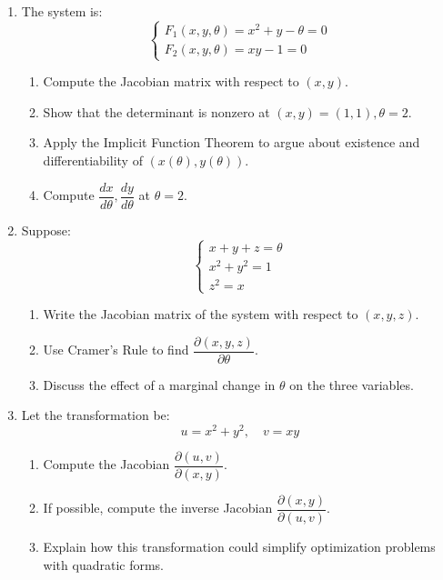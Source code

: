 \documentclass[12pt]{article}
\begin{document}
\begin{enumerate}
\item The system is:
\[
\begin{cases}
F_1(x,y,\theta) = x^2 + y - \theta = 0 \\
F_2(x,y,\theta) = xy - 1 = 0
\end{cases}
\]
\begin{enumerate}[label=(\alph*)]
\item Compute the Jacobian matrix with respect to $(x,y)$.
\item Show that the determinant is nonzero at $(x,y)=(1,1), \theta=2$.
\item Apply the Implicit Function Theorem to argue about existence and differentiability of $(x(\theta), y(\theta))$.
\item Compute $\dfrac{dx}{d\theta}, \dfrac{dy}{d\theta}$ at $\theta=2$.
\end{enumerate}


\item Suppose:
\[
\begin{cases}
x + y + z = \theta \\
x^2 + y^2 = 1 \\
z^2 = x
\end{cases}
\]
\begin{enumerate}[label=(\alph*)]
\item Write the Jacobian matrix of the system with respect to $(x,y,z)$.
\item Use Cramer’s Rule to find $\dfrac{\partial(x,y,z)}{\partial \theta}$.
\item Discuss the effect of a marginal change in $\theta$ on the three variables.
\end{enumerate}


\item Let the transformation be:
\[
u = x^2 + y^2, \quad v = xy
\]
\begin{enumerate}[label=(\alph*)]
\item Compute the Jacobian $\dfrac{\partial(u,v)}{\partial(x,y)}$.
\item If possible, compute the inverse Jacobian $\dfrac{\partial(x,y)}{\partial(u,v)}$.
\item Explain how this transformation could simplify optimization problems with quadratic forms.
\end{enumerate}
\end{enumerate}
\end{document}
